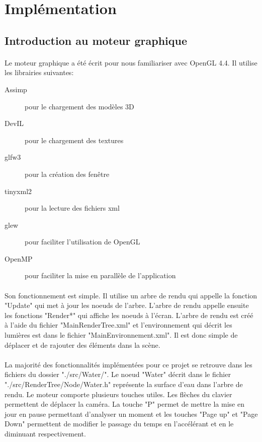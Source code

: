 \documentclass[a4paper, 12pt]{article} %
\begin{document}
\section{Implémentation}
\subsection{Introduction au moteur graphique}
	\paragraph{}
	Le moteur graphique a été écrit pour nous familiariser avec OpenGL 4.4. Il utilise les librairies suivantes:
	\begin{description}
		\item[Assimp] pour le chargement des modèles 3D
		\item[DevIL] pour le chargement des textures
		\item[glfw3] pour la création des fenêtre
		\item[tinyxml2] pour la lecture des fichiers xml
		\item[glew] pour faciliter l'utilisation de OpenGL
		\item[OpenMP] pour faciliter la mise en parallèle de l'application
	\end{description}
	
	\paragraph{}
	Son fonctionnement est simple. Il utilise un arbre de rendu qui appelle la fonction "Update" qui met à jour les noeuds de l'arbre.
	L'arbre de rendu appelle ensuite les fonctions "Render*" qui affiche les noeuds à l'écran. L'arbre de rendu est créé à l'aide du
	fichier "MainRenderTree.xml" et l'environnement qui décrit les lumières est dans le fichier "MainEnvironnement.xml". Il est donc
	simple de déplacer et de rajouter des éléments dans la scène.

	\paragraph{}
	La majorité des fonctionnalités implémentées pour ce projet se retrouve dans les fichiers du dossier "./src/Water/". Le noeud 
	"Water" décrit dans le fichier "./src/RenderTree/Node/Water.h" représente la surface d'eau dans l'arbre de rendu.
	Le moteur comporte plusieurs touches utiles. Les flèches du clavier permettent de déplacer la caméra. La touche "P" permet de mettre la mise en jour
	en pause permettant d'analyser un moment et les touches "Page up" et "Page Down" permettent de modifier le passage du temps en l'accélérant et en 
	le diminuant respectivement.
\end{document}
